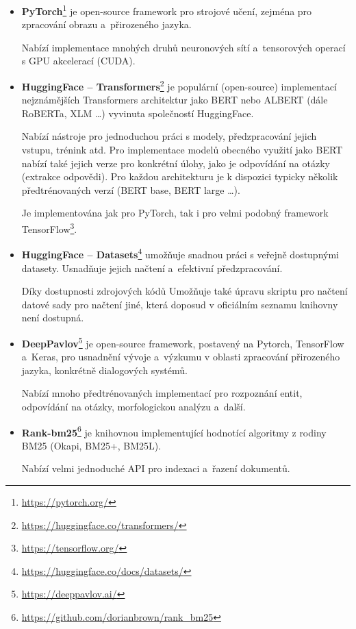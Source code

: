 \begin{itemize}
    \item \textbf{PyTorch}\footnote{\url{https://pytorch.org/}}
    je open-source framework pro strojové učení, zejména pro zpracování obrazu a~přirozeného jazyka. \par
    Nabízí implementace mnohých druhů neuronových sítí a~tensorových operací s GPU akcelerací (CUDA).
    
    \item \textbf{HuggingFace -- Transformers}\footnote{\url{https://huggingface.co/transformers/}}
    je populární (open-source) implementací nejznámějších Transformers architektur jako BERT nebo ALBERT (dále RoBERTa, XLM \dots) vyvinuta společností HuggingFace.\par
    Nabízí nástroje pro jednoduchou práci s modely, předzpracování jejich vstupu, trénink atd. Pro implementace modelů obecného využití jako BERT nabízí také jejich verze pro konkrétní úlohy, jako je odpovídání na otázky (extrakce odpovědi). Pro každou architekturu je k dispozici typicky několik předtrénovaných verzí (BERT base, BERT large \dots).\par
    Je implementována jak pro PyTorch, tak i pro velmi podobný framework TensorFlow\footnote{\url{https://tensorflow.org/}}.
    
    \item \textbf{HuggingFace -- Datasets}\footnote{\url{https://huggingface.co/docs/datasets/}}
    umožňuje snadnou práci s veřejně dostupnými datasety. Usnadňuje jejich načtení a~efektivní předzpracování.\par 
    Díky dostupnosti zdrojových kódů Umožňuje také úpravu skriptu pro načtení datové sady pro načtení jiné, která doposud v oficiálním seznamu knihovny není dostupná.
    
    \item \textbf{DeepPavlov}\footnote{\url{https://deeppavlov.ai/}}
    je open-source framework, postavený na Pytorch, TensorFlow a~Keras, pro usnadnění vývoje a~výzkumu v oblasti zpracování přirozeného jazyka, konkrétně dialogových systémů.\par
    Nabízí mnoho předtrénovaných implementací pro rozpoznání entit, odpovídání na otázky, morfologickou analýzu a~další.
    
    \item \textbf{Rank-bm25}\footnote{\url{https://github.com/dorianbrown/rank\_bm25}}
    je knihovnou implementující hodnotící algoritmy z rodiny BM25 \cite{bm25_improvements} (Okapi, BM25+, BM25L).\par
    Nabízí velmi jednoduché API pro indexaci a~řazení dokumentů.
    

\end{itemize}
